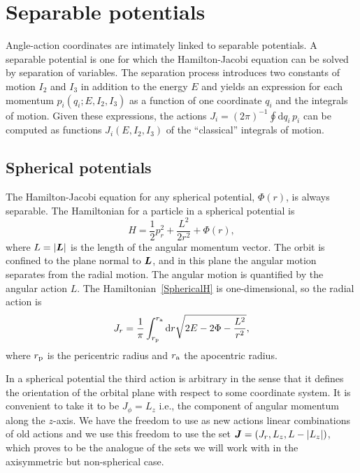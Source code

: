 \documentclass[useAMS,usenatbib,fleqn,a4paper]{mn2e}
\def\ra{r_{\rm a}}
\def\rp{r_{\rm p}}
\def\half{{\textstyle{\frac12}}}
\newcommand{\bs}[1]{\bmath{#1}}
\begin{document}
\section{Separable potentials}\label{Sect::Separable}

Angle-action coordinates are intimately linked to separable potentials. A
separable potential is one for which the Hamilton-Jacobi equation can be
solved by separation of variables. The separation process introduces two
constants of motion $I_2$ and $I_3$ in addition to the energy $E$ and yields an
expression for each momentum $p_i(q_i;E,I_2,I_3)$ as a function of one
coordinate $q_i$ and the integrals of motion. Given these expressions, the
actions $J_i=(2\pi)^{-1}\oint\mathrm{d} q_i\,p_i$ can be computed as
functions $J_i(E,I_2,I_3)$ of the ``classical'' integrals of motion.


\subsection{Spherical potentials}

The Hamilton-Jacobi equation for any spherical potential, $\Phi(r)$, is
always separable. The Hamiltonian for a particle in a spherical potential is
\begin{equation}
H = \half p_r^2 +\frac{L^2}{2r^2} + \Phi(r),
\label{SphericalH}
\end{equation}
 where $L=|\bs{L}|$ is the length of the angular momentum vector.  The orbit
is confined to the plane normal to $\bs{L}$, and in this plane the angular
motion separates from the radial motion. The angular motion is quantified by
the angular action $L$. The
Hamiltonian~\eqref{SphericalH} is one-dimensional, so the radial
action is
\begin{equation}\label{JrSphere}
J_r =
\frac{1}{\pi}\int_{\rp}^{\ra}\mathrm{d}r\sqrt{2E-2\Phi-\frac{L^2}{r^2}},
\end{equation}
where $\rp$ is the pericentric radius and $\ra$ the
apocentric radius.

In a spherical potential the third action is  arbitrary in the sense that it
defines the orientation of the orbital plane with respect to some coordinate
system.  It is convenient to take it to be $J_\phi=L_z$ i.e., the component
of angular momentum along the $z$-axis. We have the freedom to use as new
actions linear combinations of old actions and we use this freedom to use the
set $\bs{J}=(J_r,L_z,L-|L_z|)$, which proves to be the analogue of the sets
we will work with in the  axisymmetric but non-spherical case.
\end{document}
